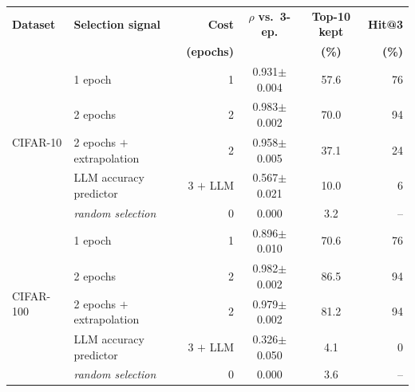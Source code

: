 \begin{tabular}{l l r cc r}
\toprule
\textbf{Dataset} & \textbf{Selection signal} & \textbf{Cost} & $\rho$ \textbf{vs.\ 3-ep.} & \textbf{Top-10 kept} & \textbf{Hit@3} \\
 & & \textbf{(epochs)} & & \textbf{(\%)} & \textbf{(\%)} \\
\midrule
\multirow{5}{*}{CIFAR-10}
 & 1 epoch & 1 & 0.931$\pm$0.004 & 57.6 & 76 \\
 & 2 epochs & 2 & 0.983$\pm$0.002 & 70.0 & 94 \\
 & 2 epochs $+$ extrapolation & 2 & 0.958$\pm$0.005 & 37.1 & 24 \\
 & LLM accuracy predictor & 3 $+$ LLM & 0.567$\pm$0.021 & 10.0 & 6 \\
 & \textit{random selection} & 0 & 0.000 & 3.2 & -- \\
\midrule
\multirow{5}{*}{CIFAR-100}
 & 1 epoch & 1 & 0.896$\pm$0.010 & 70.6 & 76 \\
 & 2 epochs & 2 & 0.982$\pm$0.002 & 86.5 & 94 \\
 & 2 epochs $+$ extrapolation & 2 & 0.979$\pm$0.002 & 81.2 & 94 \\
 & LLM accuracy predictor & 3 $+$ LLM & 0.326$\pm$0.050 & 4.1 & 0 \\
 & \textit{random selection} & 0 & 0.000 & 3.6 & -- \\
\bottomrule
\end{tabular}
